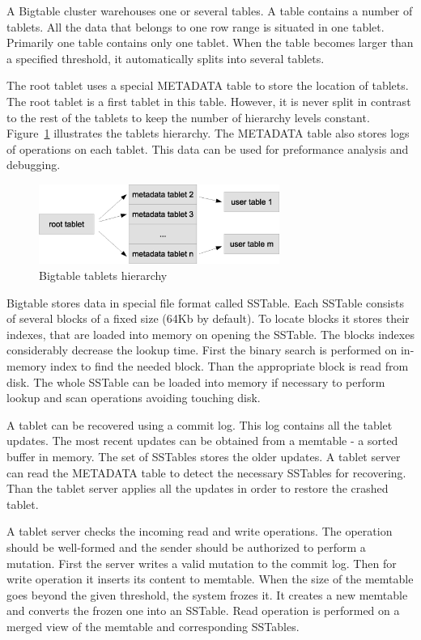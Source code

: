 A Bigtable cluster warehouses one or several tables.
A table contains a number of tablets. 
All the data that belongs to one row range is situated in one tablet.
Primarily one table contains only one tablet.
When the table becomes larger than a specified threshold, it automatically splits into several tablets.

The root tablet uses a special METADATA table to store the location of tablets.
The root tablet is a first tablet in this table.
However, it is never split in contrast to the rest of the tablets to keep the number of hierarchy levels constant.
Figure~\ref{fig:bigtable_tablets_hierarchy} illustrates the tablets hierarchy.
The METADATA table also stores logs of operations on each tablet.
This data can be used for preformance analysis and debugging.  

\begin{figure}
  \centering
  \includegraphics [width=0.7\textwidth]{images/bigtable_tablets_hierarchy}
  \caption{Bigtable tablets hierarchy}
  \label{fig:bigtable_tablets_hierarchy}
\end{figure}

Bigtable stores data in special file format called SSTable.
Each SSTable consists of several blocks of a fixed size (64Kb by default). 
To locate blocks it stores their indexes, that are loaded into memory on opening the SSTable.
The blocks indexes considerably decrease the lookup time.
First the binary search is performed on in-memory index to find the needed block.
Than the appropriate block is read from disk.
The whole SSTable can be loaded into memory if necessary to perform lookup and scan operations avoiding touching disk.

A tablet can be recovered using a commit log.
This log contains all the tablet updates.
The most recent updates can be obtained from a memtable - a sorted buffer in memory.
The set of SSTables stores the older updates. 
A tablet server can read the METADATA table to detect the necessary SSTables for recovering.
Than the tablet server applies all the updates in order to restore the crashed tablet. 
  
A tablet server checks the incoming read and write operations.
The operation should be well-formed and the sender should be authorized to perform a mutation.
First the server writes a valid mutation to the commit log.
Then for write operation it inserts its content to memtable.
When the size of the memtable goes beyond the given threshold, the system frozes it.
It creates a new memtable and converts the frozen one into an SSTable. 
Read operation is performed on a merged view of the memtable and corresponding SSTables.

